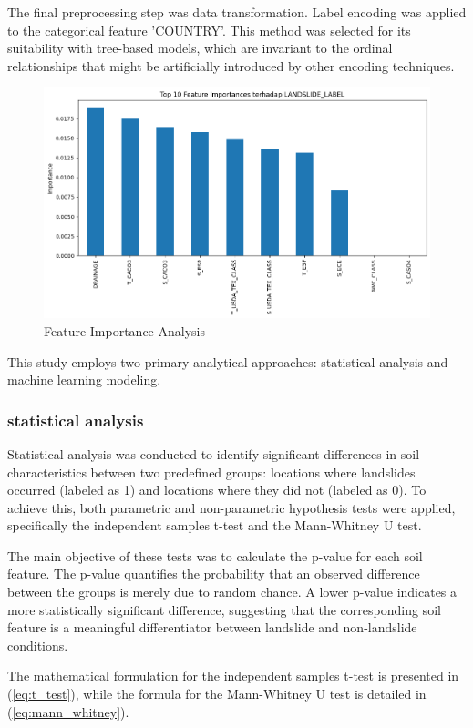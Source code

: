 The final preprocessing step was data transformation. Label encoding was applied to the categorical feature 'COUNTRY'. This method was selected for its suitability with tree-based models, which are invariant to the ordinal relationships that might be artificially introduced by other encoding techniques\cite{mthd03}. 
\begin{figure}[htbp]
    \centerline{\includegraphics[width=\linewidth]{fig4.png}}
    \caption{Feature Importance Analysis}
    \label{fig:feature-importance}
\end{figure}
This study employs two primary analytical approaches: statistical analysis and machine learning modeling.

\subsubsection{statistical analysis}
Statistical analysis was conducted to identify significant differences in soil characteristics between two predefined groups: locations where landslides occurred (labeled as 1) and locations where they did not (labeled as 0). To achieve this, both parametric and non-parametric hypothesis tests were applied, specifically the independent samples t-test and the Mann-Whitney U test\cite{mthd04}.

The main objective of these tests was to calculate the p-value for each soil feature. The p-value quantifies the probability that an observed difference between the groups is merely due to random chance. A lower p-value indicates a more statistically significant difference, suggesting that the corresponding soil feature is a meaningful differentiator between landslide and non-landslide conditions.

The mathematical formulation for the independent samples t-test is presented in (\ref{eq:t_test}), while the formula for the Mann-Whitney U test is detailed in (\ref{eq:mann_whitney}).

